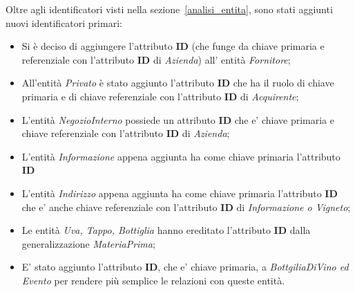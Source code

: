 Oltre agli identificatori visti nella sezione~\ref{analisi_entita}, sono stati aggiunti nuovi identificatori primari:

\begin{itemize}
	\item Si è deciso di aggiungere l'attributo \textbf{ID} (che funge da chiave primaria e referenziale con l'attributo \textbf{ID} di \emph{Azienda}) all' entità \emph{Fornitore};
	\item All'entità \emph{Privato} è stato aggiunto l'attributo \textbf{ID} che ha il ruolo di chiave primaria e di chiave referenziale con l'attributo \textbf{ID} di \emph{Acquirente};
	\item L'entità \emph{NegozioInterno} possiede un attributo \textbf{ID} che e' chiave primaria e chiave referenziale con l'attributo \textbf{ID} di \emph{Azienda};
	\item L'entità \emph{Informazione} appena aggiunta ha come chiave primaria l'attributo \textbf{ID}
	\item L'entità \emph{Indirizzo} appena aggiunta ha come chiave primaria l'attributo \textbf{ID} che e' anche chiave referenziale con l'attributo \textbf{ID} di \emph{Informazione o Vigneto};
	\item Le entità \emph{Uva, Tappo, Bottiglia} hanno ereditato l'attributo \textbf{ID} dalla generalizzazione \emph{MateriaPrima};
	\item E' stato aggiunto l'attributo \textbf{ID}, che e' chiave primaria, a \emph{BottgiliaDiVino ed Evento} per rendere più semplice le relazioni con queste entità.
\end{itemize}